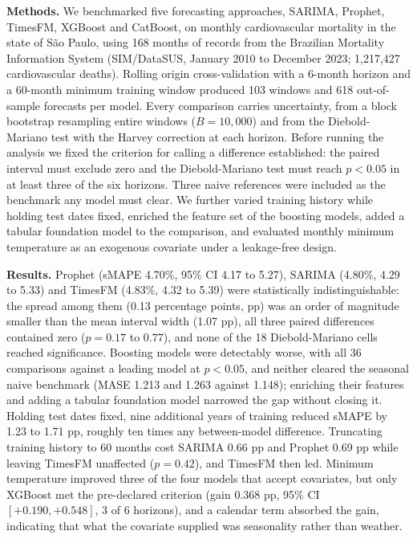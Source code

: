 \noindent\textbf{Methods.} We benchmarked five forecasting approaches, SARIMA, Prophet,
TimesFM, XGBoost and CatBoost, on monthly cardiovascular mortality in the state of
S\~ao Paulo, using 168 months of records from the Brazilian Mortality Information System
(SIM/DataSUS, January 2010 to December 2023; 1{,}217{,}427 cardiovascular deaths).
Rolling origin cross-validation with a 6-month horizon and a 60-month minimum training
window produced 103 windows and 618 out-of-sample forecasts per model. Every comparison
carries uncertainty, from a block bootstrap resampling entire windows ($B=10{,}000$) and
from the Diebold-Mariano test with the Harvey correction at each horizon. Before running
the analysis we fixed the criterion for calling a difference established: the paired
interval must exclude zero and the Diebold-Mariano test must reach $p<0.05$ in at least
three of the six horizons. Three naive references were included as the benchmark any model
must clear. We further varied training history while holding test dates fixed, enriched
the feature set of the boosting models, added a tabular foundation model to the
comparison, and evaluated monthly minimum temperature as an exogenous covariate under a
leakage-free design.

\noindent\textbf{Results.} Prophet (sMAPE 4.70\%, 95\% CI 4.17 to 5.27), SARIMA (4.80\%,
4.29 to 5.33) and TimesFM (4.83\%, 4.32 to 5.39) were statistically indistinguishable:
the spread among them (0.13 percentage points, pp) was an order of magnitude smaller than
the mean interval width (1.07 pp), all three paired differences contained zero
($p=0.17$ to $0.77$), and none of the 18 Diebold-Mariano cells reached significance.
Boosting models were detectably worse, with all 36 comparisons against a leading model at
$p<0.05$, and neither cleared the seasonal naive benchmark (MASE 1.213 and 1.263 against
1.148); enriching their features and adding a tabular foundation model narrowed the gap
without closing it. Holding test dates fixed, nine additional years of training reduced
sMAPE by 1.23 to 1.71 pp, roughly ten times any between-model difference. Truncating
training history to 60 months cost SARIMA 0.66 pp and Prophet 0.69 pp while leaving
TimesFM unaffected ($p=0.42$), and TimesFM then led. Minimum temperature improved three of
the four models that accept covariates, but only XGBoost met the pre-declared criterion
(gain 0.368 pp, 95\% CI $[+0.190, +0.548]$, 3 of 6 horizons), and a calendar term absorbed
the gain, indicating that what the covariate supplied was seasonality rather than weather.

